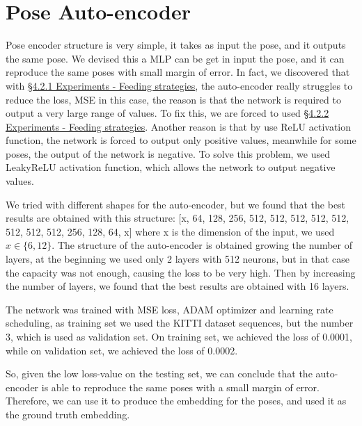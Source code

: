 \section{Pose Auto-encoder}\label{sec:pose-auto-encoder}
Pose encoder structure is very simple, it takes as input the pose, and it outputs the same pose.
We devised this a MLP can be get in input the pose, and it can reproduce the same poses with small margin of error.
In fact, we discovered that with \hyperref[subsec:directly-feeding-the-sequence]{\S4.2.1 Experiments - Feeding strategies}, the auto-encoder really struggles to reduce the loss, MSE in this case, the reason is that the network is required to output a very large range of values.
To fix this, we are forced to used \hyperref[subsec:sequence-with-origin]{\S4.2.2 Experiments - Feeding strategies}.
Another reason is that by use ReLU activation function, the network is forced to output only positive values, meanwhile for some poses, the output of the network is negative.
To solve this problem, we used LeakyReLU activation function, which allows the network to output negative values.

We tried with different shapes for the auto-encoder, but we found that the best results are obtained with this structure:
[x, 64, 128, 256, 512, 512, 512, 512, 512, 512, 512, 512, 256, 128, 64,  x]
where x is the dimension of the input, we used $x \in \{6, 12\}$.
The structure of the auto-encoder is obtained growing the number of layers, at the beginning we used only 2 layers with 512 neurons, but in that case the capacity was not enough, causing the loss to be very high.
Then by increasing the number of layers, we found that the best results are obtained with 16 layers.

The network was trained with MSE loss, ADAM optimizer and learning rate scheduling, as training set we used the KITTI dataset sequences, but the number 3, which is used as validation set.
On training set, we achieved the loss of 0.0001, while on validation set, we achieved the loss of 0.0002. %

So, given the low loss-value on the testing set, we can conclude that the auto-encoder is able to reproduce the same poses with a small margin of error.
Therefore, we can use it to produce the embedding for the poses, and used it as the ground truth embedding.
